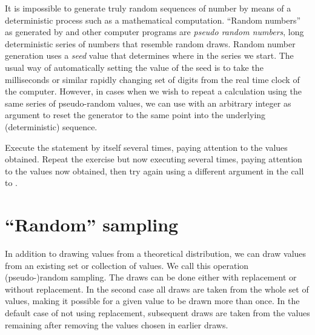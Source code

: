 \documentclass[krantz2]{krantz}\usepackage{knitr}%
\begin{document}
\begin{explainbox}
It is impossible to generate truly random sequences of number by means of a deterministic process such as a mathematical computation. ``Random numbers'' as generated by \Rpgrm and other computer programs are \emph{pseudo random numbers}, long deterministic series of numbers that resemble random draws. Random number generation uses a \emph{seed} value that determines where in the series we start. The usual way of automatically setting the value of the seed is to take the milliseconds or similar rapidly changing set of digits from the real time clock of the computer. However, in cases when we wish to repeat a calculation using the same series of pseudo-random values, we can use  with an arbitrary integer as argument to reset the generator to the same point into the underlying (deterministic) sequence.
\end{explainbox}

\begin{advplayground}
Execute the statement  by itself several times, paying attention to the values obtained. Repeat the exercise but now executing  several times, paying attention to the values now obtained, then try again using a different argument in the call to .
\end{advplayground}

\section{``Random'' sampling}
%
%

In addition to drawing values from a theoretical distribution, we can draw values from an existing set or collection of values. We call this operation (pseudo-)random sampling. The draws can be done either with replacement or without replacement. In the second case all draws are taken from the whole set of values, making it possible for a given value to be drawn more than once. In the default case of not using replacement, subsequent draws are taken from the values remaining after removing the values chosen in earlier draws.
\end{document}

